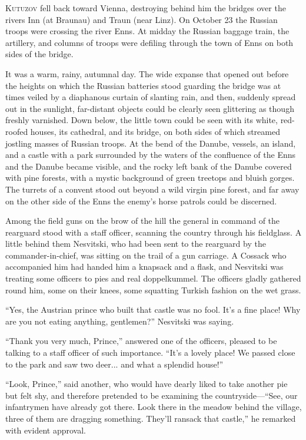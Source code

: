 \lettrine[lines=2, loversize=0.3, lraise=0]{\initfamily K}{utuzov}
fell back toward Vienna, destroying behind him the
bridges over the rivers Inn (at Braunau) and Traun (near
Linz). On October 23 the Russian troops were crossing the river
Enns. At midday the Russian baggage train, the artillery, and
columns of troops were defiling through the town of Enns on both
sides of the bridge.

It was a warm, rainy, autumnal day. The wide expanse that opened
out before the heights on which the Russian batteries stood
guarding the bridge was at times veiled by a diaphanous curtain
of slanting rain, and then, suddenly spread out in the sunlight,
far-distant objects could be clearly seen glittering as though
freshly varnished. Down below, the little town could be seen with
its white, red-roofed houses, its cathedral, and its bridge, on
both sides of which streamed jostling masses of Russian
troops. At the bend of the Danube, vessels, an island, and a
castle with a park surrounded by the waters of the confluence of
the Enns and the Danube became visible, and the rocky left bank
of the Danube covered with pine forests, with a mystic background
of green treetops and bluish gorges. The turrets of a convent
stood out beyond a wild virgin pine forest, and far away on the
other side of the Enns the enemy's horse patrols could be
discerned.

Among the field guns on the brow of the hill the general in
command of the rearguard stood with a staff officer, scanning the
country through his fieldglass. A little behind them Nesvitski,
who had been sent to the rearguard by the commander-in-chief, was
sitting on the trail of a gun carriage. A Cossack who accompanied
him had handed him a knapsack and a flask, and Nesvitski was
treating some officers to pies and real doppelkummel. The
officers gladly gathered round him, some on their knees, some
squatting Turkish fashion on the wet grass.

``Yes, the Austrian prince who built that castle was no
fool. It's a fine place! Why are you not eating anything,
gentlemen?'' Nesvitski was saying.

``Thank you very much, Prince,'' answered one of the officers,
pleased to be talking to a staff officer of such
importance. ``It's a lovely place!  We passed close to the park
and saw two deer... and what a splendid house!''

``Look, Prince,'' said another, who would have dearly liked to
take another pie but felt shy, and therefore pretended to be
examining the countryside---``See, our infantrymen have already
got there. Look there in the meadow behind the village, three of
them are dragging something.  They'll ransack that castle,'' he
remarked with evident approval.

